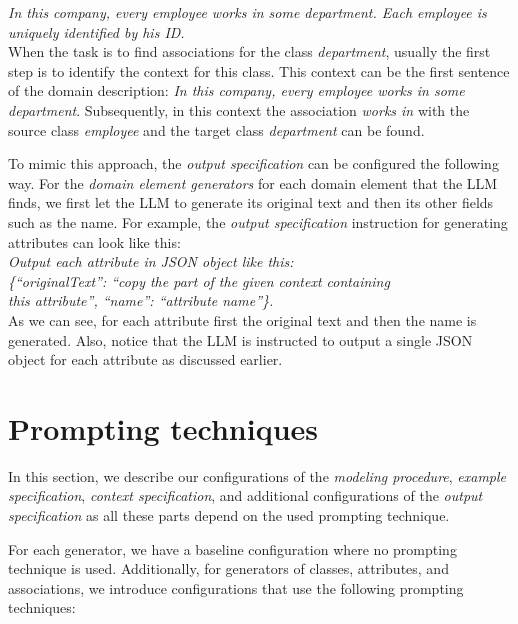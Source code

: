 \noindent{}\textit{In this company, every employee works in some department. Each employee is uniquely identified by his ID.} \\

\noindent{}When the task is to find associations for the class \textit{department}, usually the first step is to identify the context for this class. This context can be the first sentence of the domain description: \textit{In this company, every employee works in some department}. Subsequently, in this context the association \textit{works in} with the source class \textit{employee} and the target class \textit{department} can be found.

To mimic this approach, the \emph{output specification} can be configured the following way. For the \emph{domain element generators} for each domain element that the LLM finds, we first let the LLM to generate its original text and then its other fields such as the name. For example, the \emph{output specification} instruction for generating attributes can look like this: \\

\noindent{}\textit{Output each attribute in JSON object like this: \\
\{``originalText'': ``copy the part of the given context containing \\ this attribute'', ``name'': ``attribute name''\}.} \\

\noindent{}As we can see, for each attribute first the original text and then the name is generated. Also, notice that the LLM is instructed to output a single JSON object for each attribute as discussed earlier.



\section{Prompting techniques}

In this section, we describe our configurations of the \emph{modeling procedure}, \emph{example specification}, \emph{context specification}, and additional configurations of the \emph{output specification} as all these parts depend on the used prompting technique.

For each generator, we have a baseline configuration where no prompting technique is used. Additionally, for generators of classes, attributes, and associations, we introduce configurations that use the following prompting techniques:

